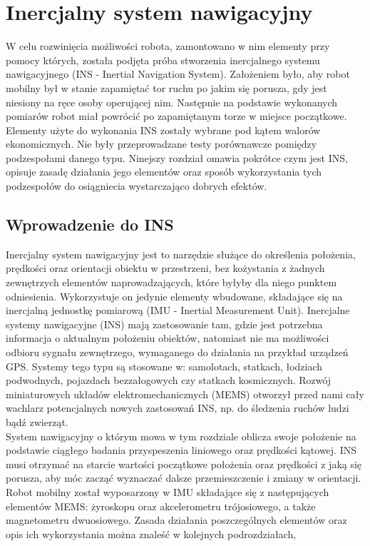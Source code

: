 \section{Inercjalny system nawigacyjny}
W celu rozwinięcia możliwości robota, zamontowano w nim elementy przy pomocy których,
została podjęta próba stworzenia inercjalnego systemu nawigacyjnego (INS - Inertial Navigation System).
Założeniem było, aby robot mobilny był w stanie zapamiętać tor ruchu po jakim się porusza, 
gdy jest niesiony na ręce osoby operującej nim. Następnie na podstawie wykonanych 
pomiarów robot miał powrócić po zapamiętanym torze w miejsce początkowe.
Elementy użyte do wykonania INS zostały wybrane pod kątem walorów ekonomicznych. Nie były przeprowadzane testy
porównawcze pomiędzy podzespołami danego typu.
Ninejszy rozdział omawia pokrótce czym jest INS, opisuje zasadę działania jego elementów oraz sposób wykorzystania 
tych podzespołów do osiągniecia wystarczająco dobrych efektów.

\subsection{Wprowadzenie do INS}

Inercjalny system nawigacyjny jest to narzędzie służące do określenia położenia, prędkości oraz orientacji obiektu w przestrzeni,
bez kożystania z żadnych zewnętrzych elementów naprowadzających, które byłyby dla niego punktem odniesienia.
Wykorzystuje on jedynie elementy wbudowane, składające się na inercjalną jednostkę pomiarową (IMU - Inertial Measurement Unit).
Inercjalne systemy nawigacyjne (INS) mają zastosowanie tam, gdzie jest potrzebna informacja
o aktualnym położeniu obiektów, natomiast nie ma możliwości odbioru sygnału zewnętrzego, wymaganego do działania na przykład
urządzeń GPS. Systemy tego typu są stosowane w: samolotach, statkach, łodziach podwodnych, pojazdach bezzałogowych
czy statkach kosmicznych. Rozwój miniaturowych układów elektromechanicznych (MEMS) otworzył przed nami cały wachlarz
potencjalnych nowych zastosowań INS, np. do śledzenia ruchów ludzi bądź zwierząt.
\\
System nawigacyjny o którym mowa w tym rozdziale oblicza swoje położenie na podstawie ciągłego badania przyspeszenia liniowego
oraz prędkości kątowej. INS musi otrzymać na starcie wartości początkowe położenia oraz prędkości z jaką się porusza, aby móc
zacząć wyznaczać dalsze przemieszczenie i zmiany w orientacji.
\\
Robot mobilny został wyposarzony w IMU składające się z następujących elementów MEMS: żyroskopu oraz akcelerometru 
trójosiowego, a także magnetometru dwuosiowego. Zasada działania poszczególnych elementów oraz opis ich wykorzystania 
można znaleść w kolejnych podrozdziałach,
